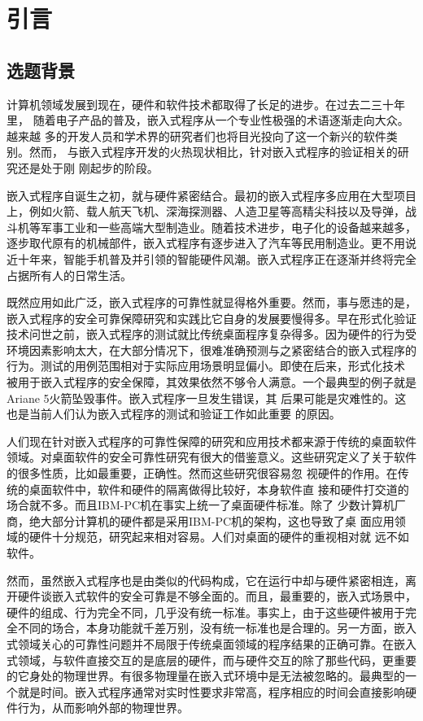 
\chapter{引言}
\label{cha:intro}

\section{选题背景}
\label{sec:background}

计算机领域发展到现在，硬件和软件技术都取得了长足的进步。在过去二三十年里，
随着电子产品的普及，嵌入式程序从一个专业性极强的术语逐渐走向大众。越来越
多的开发人员和学术界的研究者们也将目光投向了这一个新兴的软件类别。然而，
与嵌入式程序开发的火热现状相比，针对嵌入式程序的验证相关的研究还是处于刚
刚起步的阶段。

嵌入式程序自诞生之初，就与硬件紧密结合。最初的嵌入式程序多应用在大型项目
上，例如火箭、载人航天飞机、深海探测器、人造卫星等高精尖科技以及导弹，战
斗机等军事工业和一些高端大型制造业。随着技术进步，电子化的设备越来越多，
逐步取代原有的机械部件，嵌入式程序有逐步进入了汽车等民用制造业。更不用说
近十年来，智能手机普及并引领的智能硬件风潮。嵌入式程序正在逐渐并终将完全
占据所有人的日常生活。

既然应用如此广泛，嵌入式程序的可靠性就显得格外重要。然而，事与愿违的是，
嵌入式程序的安全可靠保障研究和实践比它自身的发展要慢得多。早在形式化验证
技术问世之前，嵌入式程序的测试就比传统桌面程序复杂得多。因为硬件的行为受
环境因素影响太大，在大部分情况下，很难准确预测与之紧密结合的嵌入式程序的
行为。测试的用例范围相对于实际应用场景明显偏小。即使在后来，形式化技术
被用于嵌入式程序的安全保障，其效果依然不够令人满意。一个最典型的例子就是
Ariane 5火箭坠毁事件\cite{www.around.com}。嵌入式程序一旦发生错误，其
后果可能是灾难性的。这也是当前人们认为嵌入式程序的测试和验证工作如此重要
的原因。

人们现在针对嵌入式程序的可靠性保障的研究和应用技术都来源于传统的桌面软件
领域。对桌面软件的安全可靠性研究有很大的借鉴意义。这些研究定义了关于软件
的很多性质，比如最重要，正确性\cite{Harel198061}。然而这些研究很容易忽
视硬件的作用。在传统的桌面软件中，软件和硬件的隔离做得比较好，本身软件直
接和硬件打交道的场合就不多。而且IBM-PC机在事实上统一了桌面硬件标准。除了
少数计算机厂商，绝大部分计算机的硬件都是采用IBM-PC机的架构，这也导致了桌
面应用领域的硬件十分规范，研究起来相对容易。人们对桌面的硬件的重视相对就
远不如软件。

然而，虽然嵌入式程序也是由类似的代码构成，它在运行中却与硬件紧密相连，离
开硬件谈嵌入式软件的安全可靠是不够全面的。而且，最重要的，嵌入式场景中，
硬件的组成、行为完全不同，几乎没有统一标准。事实上，由于这些硬件被用于完
全不同的场合，本身功能就千差万别，没有统一标准也是合理的。另一方面，嵌入
式领域关心的可靠性问题并不局限于传统桌面领域的程序结果的正确可靠。在嵌入
式领域，与软件直接交互的是底层的硬件，而与硬件交互的除了那些代码，更重要
的它身处的物理世界。有很多物理量在嵌入式环境中是无法被忽略的。最典型的一
个就是时间。嵌入式程序通常对实时性要求非常高，程序相应的时间会直接影响硬
件行为，从而影响外部的物理世界。

